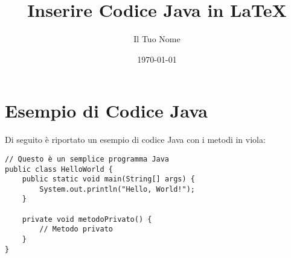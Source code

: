 \documentclass{article}
\title{Inserire Codice Java in LaTeX}
\author{Il Tuo Nome}
\date{\today}
\begin{document}
    \maketitle

    \section{Esempio di Codice Java}

    Di seguito è riportato un esempio di codice Java con i metodi in viola:

    \begin{lstlisting}
// Questo è un semplice programma Java
public class HelloWorld {
    public static void main(String[] args) {
        System.out.println("Hello, World!");
    }

    private void metodoPrivato() {
        // Metodo privato
    }
}
    \end{lstlisting}
\end{document}
